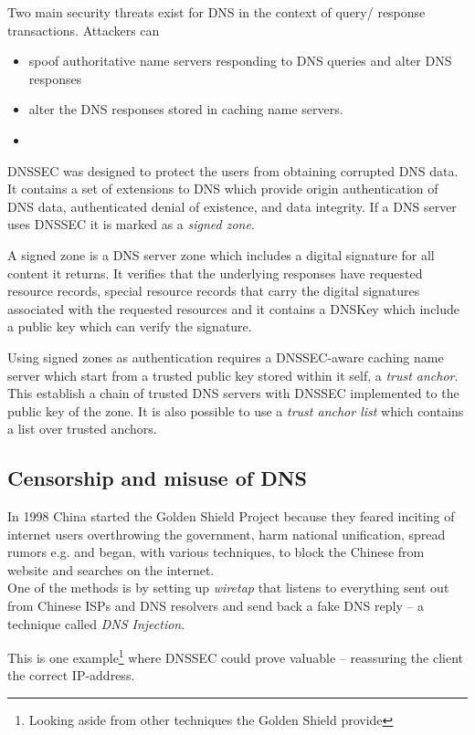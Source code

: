 \documentclass[Preamble]{subfiles}
\begin{document}
Two main security threats exist for DNS in the context of query/
response transactions. Attackers can

	\begin{itemize}%
	\item spoof authoritative name servers responding to DNS queries and alter DNS responses

	\item alter the DNS responses stored in caching name servers.
	\item[] \hspace{100mm}\cite[p. 84]{DNS-article}
	\end{itemize} 
DNSSEC was designed to protect the users from obtaining corrupted DNS data. 
It contains a set of extensions to DNS which provide origin authentication of DNS data, authenticated denial of existence, and data integrity.
If a DNS server uses DNSSEC it is marked as a \textit{signed zone}.



A signed zone is a DNS server zone which includes a digital signature for all content it returns.
It verifies that the underlying responses have requested resource records, special resource records that carry the digital signatures associated with the requested resources and it contains a DNSKey which include a public key which can verify the signature.



Using signed zones as authentication requires a DNSSEC-aware caching name server which start from a trusted public key stored within it self, a \textit{trust anchor}.
This establish a chain of trusted DNS servers with DNSSEC implemented to the public key of the zone. 
It is also possible to use a \textit{trust anchor list} which contains a list over trusted anchors.





\subsection{Censorship and misuse of DNS}


In 1998 China started the Golden Shield Project because they feared inciting of internet users overthrowing the government, harm national unification, spread rumors e.g.\cite{GFW-avoid} and began, with various techniques, to block the Chinese from website and searches on the internet.
\\
One of the methods is by setting up \textit{wiretap} that listens to everything sent out from Chinese ISPs and DNS resolvers\cite{GFW} and send back a fake DNS reply -- a technique called \textit{DNS Injection}. 


This is one example\footnote{Looking aside from other techniques the Golden Shield provide} where DNSSEC could prove valuable -- reassuring the client the correct IP-address.
\end{document}
